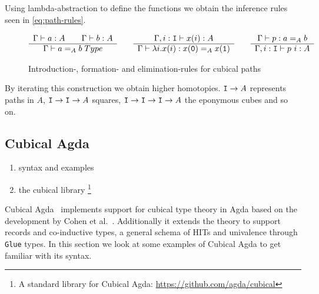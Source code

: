 Using lambda-abstraction to define the functions we obtain the inference rules
seen in \autoref{eq:path-rules}.

\begin{figure}
\begin{equation*}
  \begin{array}[t]{c}
    \Gamma \vdash a : A \qquad \Gamma \vdash b : A\\
    \hline
    \Gamma \vdash a =_A b \; Type\\
  \end{array}
  \qquad
  \begin{array}[t]{c}
    \Gamma, i : \texttt{I} \vdash x(i) : A\\
    \hline
    \Gamma \vdash \lambda i.x(i) : x(\texttt{0}) =_A x(\texttt{1})\\
  \end{array}
  \qquad
  \begin{array}[t]{c}
    \Gamma \vdash p : a =_A b\\
    \hline
    \Gamma, i : \texttt{I} \vdash p~i : A
  \end{array}
\end{equation*}
  \caption{Introduction-, formation- and elimination-rules for cubical paths}
  \label{eq:path-rules}
\end{figure}

By iterating this construction we obtain higher homotopies. $\texttt{I} \rightarrow A$
represents paths in $A$, $\texttt{I} \rightarrow \texttt{I} \rightarrow A$ squares, $\texttt{I} \rightarrow \texttt{I} \rightarrow \texttt{I} \rightarrow A$ the
eponymous cubes and so on.

\subsection{Cubical Agda}
\cite{vezzosi2021cubical}
\begin{enumerate}
  \item syntax and examples
  \item the cubical library \footnote[1]{A standard library for Cubical Agda: \url{https://github.com/agda/cubical}}
\end{enumerate}

Cubical Agda~\cite{vezzosi2021cubical} implements support for cubical type
theory in Agda based on the development by Cohen et al.~\cite{cohen2016cubical}.
Additionally it extends the theory to support records and co-inductive types, a
general schema of HITs and univalence through \texttt{Glue} types. In this
section we look at some examples of Cubical Agda to get familiar with its
syntax.

